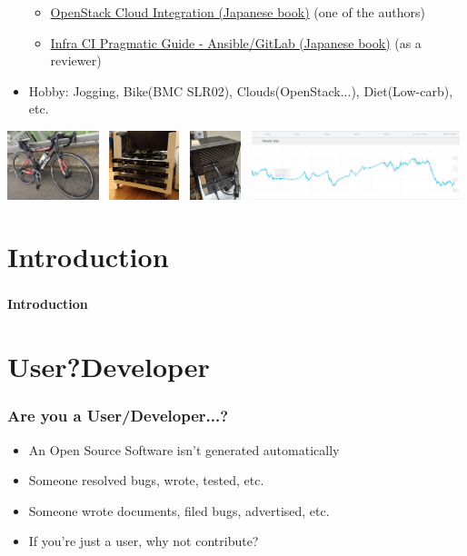 \documentclass[aspectratio=169,11pt,hyperref={colorlinks=true}]{beamer}
\begin{document}
\begin{frame}
\begin{itemize}
      \begin{itemize}
      \item \href{https://www.amazon.co.jp/dp/4798139785/}{\scriptsize{OpenStack
        Cloud Integration (Japanese book)}} (one of the authors)
      \item \href{https://www.amazon.co.jp/dp/4798155128/}{\scriptsize{Infra CI
        Pragmatic Guide - Ansible/GitLab (Japanese book)}} (as a reviewer)
      \end{itemize}
    \item Hobby: Jogging, Bike(BMC SLR02), Clouds(OpenStack...), Diet(Low-carb), etc.
  \end{itemize}
  \includegraphics[height=20mm]{images/my-bike.jpg}~
  \includegraphics[height=20mm]{images/server_front.jpg}~
  \includegraphics[height=20mm]{images/my-small-server.jpg}~
  \includegraphics[height=20mm]{images/my-weight.png}
\end{frame}

\section{Introduction}
\begin{frame}
  \frametitle{ }
  \Huge{\bf{Introduction}}
\end{frame}

\section{User?Developer}
\begin{frame}
  \frametitle{Are you a User/Developer...?}
  \begin{itemize}
    \item An Open Source Software isn't generated automatically
    \item Someone resolved bugs, wrote, tested, etc.
    \item Someone wrote documents, filed bugs, advertised, etc.
    \item If you're just a user, why not contribute?
  \end{itemize}
\end{frame}
\end{document}
